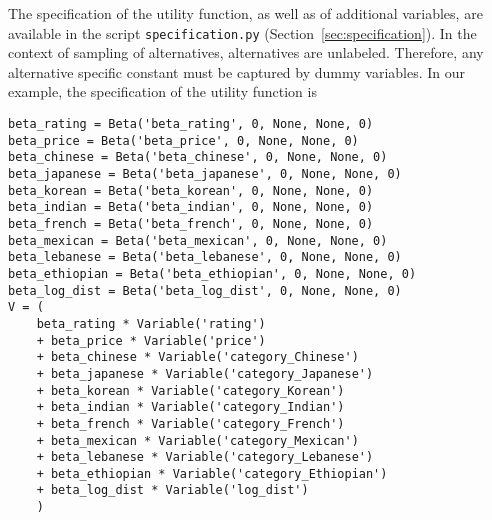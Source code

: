 \documentclass[12pt,a4paper]{article}
\begin{document}
The specification of the utility function, as well as of additional variables, are available in the script \lstinline+specification.py+ (Section~\ref{sec:specification}). In the context of sampling of alternatives, alternatives are unlabeled. Therefore, any alternative specific constant must be captured by dummy variables. In our example, the specification of the utility function is
  \begin{lstlisting}
beta_rating = Beta('beta_rating', 0, None, None, 0)
beta_price = Beta('beta_price', 0, None, None, 0)
beta_chinese = Beta('beta_chinese', 0, None, None, 0)
beta_japanese = Beta('beta_japanese', 0, None, None, 0)
beta_korean = Beta('beta_korean', 0, None, None, 0)
beta_indian = Beta('beta_indian', 0, None, None, 0)
beta_french = Beta('beta_french', 0, None, None, 0)
beta_mexican = Beta('beta_mexican', 0, None, None, 0)
beta_lebanese = Beta('beta_lebanese', 0, None, None, 0)
beta_ethiopian = Beta('beta_ethiopian', 0, None, None, 0)
beta_log_dist = Beta('beta_log_dist', 0, None, None, 0)
V = (
    beta_rating * Variable('rating')
    + beta_price * Variable('price')
    + beta_chinese * Variable('category_Chinese')
    + beta_japanese * Variable('category_Japanese')
    + beta_korean * Variable('category_Korean')
    + beta_indian * Variable('category_Indian')
    + beta_french * Variable('category_French')
    + beta_mexican * Variable('category_Mexican')
    + beta_lebanese * Variable('category_Lebanese')
    + beta_ethiopian * Variable('category_Ethiopian')
    + beta_log_dist * Variable('log_dist')
    )
  \end{lstlisting}
\end{document}
